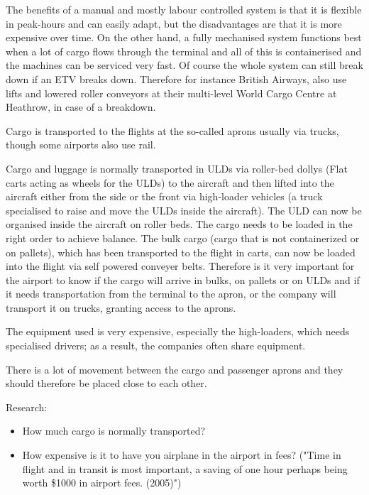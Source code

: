 The benefits of a manual and mostly labour controlled system is that it is flexible in peak-hours and can easily adapt, but the  disadvantages are that it is more expensive over time.
On the other hand, a fully mechanised system functions best when a lot of cargo flows through the terminal and all of this is containerised and the machines can be serviced very fast. Of course the whole system can still break down if an ETV breaks down.  Therefore for instance British Airways, also use lifts and lowered roller conveyors at their multi-level World Cargo Centre at Heathrow, in case of a breakdown.

Cargo is transported to the flights at the so-called aprons usually via trucks, though some airports also use rail.

Cargo and luggage is normally transported in ULDs via roller-bed dollys (Flat carts acting as wheels for the ULDs) to the aircraft and then lifted into the aircraft either from the side or the front via high-loader vehicles (a truck specialised to raise and move the ULDs inside the aircraft).
The ULD can now be organised inside the aircraft on roller beds. The cargo needs to be loaded in the right order to achieve balance. The bulk cargo (cargo that is not containerized or on pallets), which has been transported to the flight in carts, can now be loaded into the flight via self powered conveyer belts. Therefore is it very important for the airport to know if the cargo will arrive in bulks, on pallets or on ULDs and if it needs transportation from the terminal to the apron, or the company will transport it on trucks, granting access to the aprons.

The equipment used is very expensive, especially the high-loaders, which needs specialised drivers; as a result, the companies often share equipment.

There is a lot of movement between the cargo and passenger aprons and they should therefore be placed close to each other.%

Research:
\begin{itemize}
\item How much cargo is normally transported?
\item How expensive is it to have you airplane in the airport in fees? ("Time in flight and in transit is most important, a saving of one hour perhaps being worth \$1000 in airport fees. (2005)")
\end{itemize}


